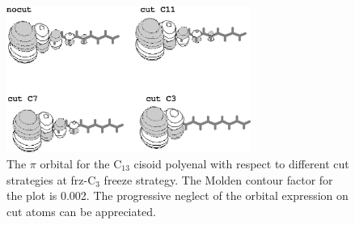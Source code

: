 \begin{figure}[!ht]
\begin{center}
\includegraphics[width=8cm]{02_localization/images/C13-orbitals.eps}
\end{center}
\caption{\footnotesize The $\pi$ orbital for the C$_{13}$ cisoid polyenal with respect to
different cut strategies at frz-C$_{3}$ freeze strategy. The Molden contour factor for
the plot is 0.002. The progressive neglect of the orbital expression on
cut atoms can be appreciated.
}
\label{fig:C13-orbitals}
\end{figure}

